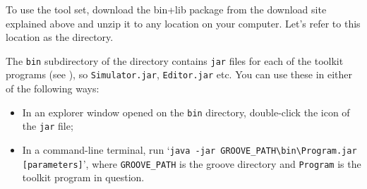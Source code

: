 To use the \GROOVE tool set, download the bin+lib package from the download
site explained above and unzip it to any location on your computer. Let's refer
to this location as the \GROOVE directory.

The \texttt{bin} subdirectory of the \GROOVE directory contains \texttt{jar}
files for each of the toolkit programs (see ), so
\texttt{Simulator.jar}, \texttt{Editor.jar} etc. You can use these in either of
the following ways:
\begin{itemize}
\item In an explorer window opened on the \texttt{bin} directory, double-click
  the icon of the \texttt{jar} file;
\item In a command-line terminal, run %
  `\verb|java -jar GROOVE_PATH\bin\Program.jar [parameters]|',%
  where \texttt{GROOVE\_PATH} is the groove directory and \texttt{Program} is
  the toolkit program in question.
\end{itemize}
